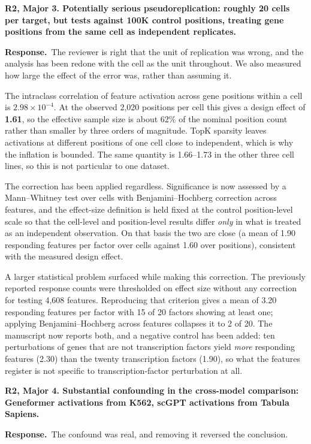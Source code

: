 \documentclass[11pt]{article}
\newcommand{\point}[1]{\vspace{0.7em}\noindent\textbf{#1}\par\vspace{0.15em}}
\newcommand{\reply}{\par\vspace{0.3em}\noindent\textbf{Response.}\ }
\begin{document}
\point{R2, Major 3. Potentially serious pseudoreplication: roughly 20 cells per target, but tests
against 100K control positions, treating gene positions from the same cell as independent
replicates.}
\reply The reviewer is right that the unit of replication was wrong, and the analysis has been redone with
the cell as the unit throughout. We also measured how large the effect of the error was, rather than
assuming it.

The intraclass correlation of feature activation across gene positions within a cell is
$2.98 \times 10^{-4}$. At the observed 2,020 positions per cell this gives a design effect of
\textbf{1.61}, so the effective sample size is about 62\% of the nominal position count rather than
smaller by three orders of magnitude. TopK sparsity leaves activations at different positions of one
cell close to independent, which is why the inflation is bounded. The same quantity is 1.66--1.73 in
the other three cell lines, so this is not particular to one dataset.

The correction has been applied regardless. Significance is now assessed by a Mann--Whitney test
over cells with Benjamini--Hochberg correction across features, and the effect-size definition is
held fixed at the control position-level scale so that the cell-level and position-level results
differ \emph{only} in what is treated as an independent observation. On that basis the two are
close (a mean of 1.90 responding features per factor over cells against 1.60 over positions),
consistent with the measured design effect.

A larger statistical problem surfaced while making this correction. The previously reported response
counts were thresholded on effect size without any correction for testing 4,608 features.
Reproducing that criterion gives a mean of 3.20 responding features per factor with 15 of 20 factors
showing at least one; applying Benjamini--Hochberg across features collapses it to 2 of 20. The
manuscript now reports both, and a negative control has been added: ten perturbations of genes that
are not transcription factors yield \emph{more} responding features (2.30) than the twenty
transcription factors (1.90), so what the features register is not specific to
transcription-factor perturbation at all.

\point{R2, Major 4. Substantial confounding in the cross-model comparison: Geneformer activations
from K562, scGPT activations from Tabula Sapiens.}
\reply The confound was real, and removing it reversed the conclusion.
\end{document}
